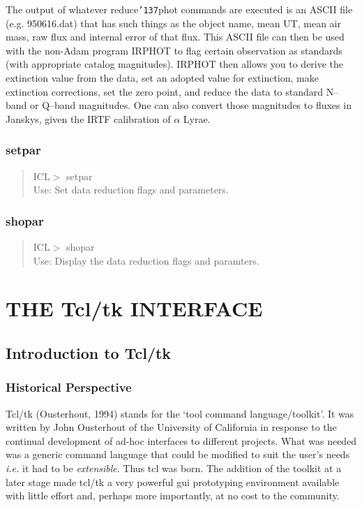 \documentclass[a4paper]{book}
\newcommand{\stardocinitials}  {SUN}
\newcommand{\stardocnumber}    {206.1}
\newcommand{\stardocname}{\stardocinitials /\stardocnumber}
\renewcommand{\_}{{\tt\char'137}}
\begin{document}
The output of whatever reduce\_phot commands are executed is an ASCII
file
(e.g. 950616.dat) that has such things as the object name, mean UT,
mean air mass, raw flux and internal error of that flux.  This ASCII file
can then be used with the non-Adam program IRPHOT to flag certain
observation as standards (with appropriate catalog magnitudes).  IRPHOT
then allows you to derive the extinction value from the data, set an
adopted value for extinction, make extinction corrections, set the
zero point, and reduce the data to standard N--band or Q--band magnitudes.
One can also convert those magnitudes to fluxes in Janskys, given the
IRTF calibration of $\alpha$ Lyrae.

\section{setpar}
\begin{quote}
ICL$>$ setpar \\
Use: Set data reduction flags and parameters. \\
\end{quote}

\section{shopar}
\begin{quote}
ICL$>$ shopar \\
Use: Display the data reduction flags and paramters. \\
\end{quote}


\part{THE Tcl/tk INTERFACE}
\pagestyle{myheadings}
\markboth{Tcl/tk Interface}{\stardocname}

\chapter{Introduction to Tcl/tk}
\section{Historical Perspective}
Tcl/tk (Ousterhout, 1994) stands for the `tool command language/toolkit'.
It was written by John Ousterhout of the University of California in
response to the continual development of ad-hoc interfaces to different
projects. What was needed was a generic command language that could be
modified to suit the user's needs {\em i.e.} it had to be {\em
extensible}. Thus tcl was born. The addition of the toolkit at a later
stage made tcl/tk a very powerful {\sc gui} prototyping environment available
with little effort and, perhaps more importantly, at no cost to the
community. 
\end{document}
